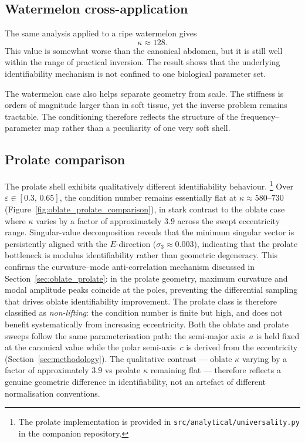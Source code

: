 \subsection{Watermelon cross-application}

The same analysis applied to a ripe watermelon gives
\begin{equation}
  \kappa \approx 128.
\end{equation}
This value is somewhat worse than the canonical abdomen, but it is still well
within the range of practical inversion.  The result shows that the underlying
identifiability mechanism is not confined to one biological parameter set.

The watermelon case also helps separate geometry from scale.  The stiffness is
orders of magnitude larger than in soft tissue, yet the inverse problem remains
tractable.  The conditioning therefore reflects the structure of the
frequency--parameter map rather than a peculiarity of one very soft shell.

\subsection{Prolate comparison}\label{sec:prolate_results}

The prolate shell exhibits qualitatively different identifiability behaviour.%
\footnote{The prolate implementation is provided in
\texttt{src/analytical/universality.py} in the companion repository.}
Over $\varepsilon \in [0.3,\,0.65]$, the condition number remains
essentially flat at $\kappa \approx 580$--$730$
(Figure~\ref{fig:oblate_prolate_comparison}), in stark contrast to the
oblate case where $\kappa$ varies by a factor of approximately $3.9$ across
the swept eccentricity range.  Singular-value decomposition reveals that
the minimum singular vector is persistently aligned with the $E$-direction
($\sigma_3 \approx 0.003$), indicating that the prolate bottleneck is
modulus identifiability rather than geometric degeneracy.  This confirms
the curvature--mode anti-correlation mechanism discussed in
Section~\ref{sec:oblate_prolate}: in the prolate geometry, maximum curvature
and modal amplitude peaks coincide at the poles, preventing the differential
sampling that drives oblate identifiability improvement.  The prolate class
is therefore classified as \emph{non-lifting}: the condition number is finite
but high, and does not benefit systematically from increasing eccentricity.
Both the oblate and prolate sweeps follow the same parameterisation
path: the semi-major axis~$a$ is held fixed at the canonical value while the
polar semi-axis~$c$ is derived from the eccentricity
(Section~\ref{sec:methodology}).  The qualitative contrast --- oblate $\kappa$
varying by a factor of approximately $3.9$ vs prolate $\kappa$ remaining flat --- therefore
reflects a genuine geometric difference in identifiability, not an artefact of
different normalisation conventions.


